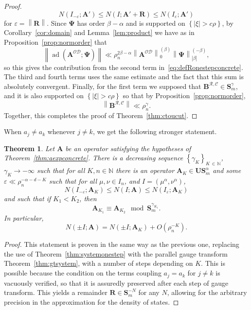 \documentclass[10pt]{amsart}
\newtheorem{theo}{Theorem}[section]
\theoremstyle{definition}\newtheorem{defi}[theo]{Definition}\newtheorem{rema}[theo]{Remark}\newtheorem{exam}[theo]{Example}\newtheorem{nota}[theo]{Notation}
\DeclareMathOperator{\ad}{ad}
\newcommand{\N}{\mathbb N}
\newcommand{\CC}{\mathcal{C}}
\newcommand{\CD}{\mathcal{D}}
\newcommand{\CO}{\mathcal{O}}
\newcommand{\CR}{\mathcal{R}}
\newcommand{\BPsi}{\boldsymbol \Psi}
\newcommand{\BA}{\mathbf A}
\newcommand{\BB}{\mathbf B}
\newcommand{\BS}{\mathbf S}
\newcommand{\BR}{\mathbf R}
\newcommand{\BU}{\mathbf U}
\newcommand{\eps}{\varepsilon}
\newcommand{\bigo}[1]{O\left(#1 \right)}
\newcommand{\abs}[1]{\left\lvert #1 \right\rvert}
\newcommand{\set}[1]{\left\{ #1 \right\}}
\newcommand{\norm}[1]{\left\| #1 \right\|}
\newcommand{\snorm}[3]{\left\| #1\right\|_{#3}^{(#2)}}
\begin{document}
\begin{proof}
\begin{equation}
N(I_{-\eps};\BA') \le N(I;\BA' + \BR) \le N(I_\eps;\BA')
\end{equation}
for $\eps = \norm{\BR}$. Since $\BPsi$ has order $\beta - \alpha$ and is supported on $\set{\abs \xi > c \rho}$, by Corollary~\ref{cor:domain} and Lemma~\ref{lem:product} we have as in Proposition~\ref{prop:normorder} that
\begin{equation}
\norm{\ad\left(\BA^{\CO\CD};\BPsi\right)} \ll \rho_n^{2 \beta - \alpha} \snorm{\BA^{\CO\CD}}{\beta}{0}
\snorm{\BPsi}{-\beta}{\abs{\beta}},
\end{equation}
so this gives the contribution from the second term in~\eqref{eq:defRonestepconcrete}. The third and fourth terms uses the same estimate and the fact that this sum is absolutely convergent. Finally, for the first term we supposed that $\BB^{\CR,\CC} \in \BS_m^{\gamma}$, and it is also supported on $\set{\abs \xi > c \rho}$ so that by Proposition~\ref{prop:normorder},
\begin{equation}
\norm{\BB^{\CR,\CC}} \ll \rho_n^{\gamma}.
\end{equation}
Together, this completes the proof of Theorem~\ref{thm:ctoucut}.
\end{proof}

When $a_j \ne a_k$ whenever $j \ne k$, we get the following stronger statement.
\begin{theo} \label{thm:ctou}
Let $\BA$ be an operator satisfying the hypotheses of Theorem~\ref{thm:aexpconcrete}. There is a decreasing sequence $\set{\gamma_K}_{K\,\in\,\N}$, $\gamma_K \to - \infty$ such that for all $K, n \in \N$ there is an operator $\BA_K \in \BU\BS_m^\alpha$ and some $\eps \ll \rho_n^{-\alpha - d - K}$ such that for all $\mu,\nu \in I_n$, and $I = (\mu^\alpha,\nu^\alpha)$,
\begin{equation}\label{eq:desiredeps}
N(I_{-\eps};\BA_K) \le N(I;\BA) \le N(I_\eps;\BA_K)
\end{equation}
and such that if $K_1 < K_2$, then
\begin{equation}
\BA_{K_1} \equiv \BA_{K_2} \mod \BS^{\gamma_{K_1}}_m.
\end{equation}
In particular,
\begin{equation}\label{eq:approxbydiagonal}
N(\pm I;\BA) = N(\pm I; \BA_K) + \bigo{\rho_n^{-K}}.
\end{equation}
\end{theo}

\begin{proof}
This statement is proven in the same way as the previous one, replacing the use of Theorem~\ref{thm:systemonestep} with the parallel gauge transform Theorem~\ref{thm:gtsystem}, with a number of steps depending on $K$. This is possible because the condition on the terms coupling $a_j=a_k$ for $j
\ne k$ is vacuously verified, so that it is assuredly preserved after each step of gauge transform. This yields a remainder $\BR \in \BS_m^{-N}$ for any $N$, allowing for the arbitrary precision in the approximation for the density of states.
\end{proof}
\end{document}
